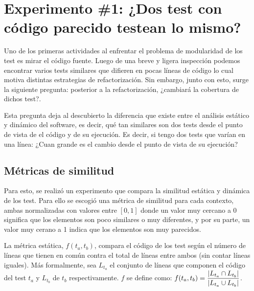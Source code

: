 \chapter{Experimento \#1: ¿Dos test con código parecido testean lo mismo? }

\par Uno de los primeras actividades al enfrentar el problema de modularidad de los test es mirar el código fuente. Luego de una breve y ligera inspección podemos encontrar varios tests similares que difieren en pocas líneas de código lo cual motiva distintas estrategias de refactorización. Sin embargo, junto con esto, surge la siguiente pregunta: posterior a la refactorización, ¿cambiará la cobertura de dichos test?. 

\par Esta pregunta deja al descubierto la diferencia que existe entre el análisis estático y dinámico del software, es decir, qué tan similares son dos tests desde el punto de vista de el código y de su ejecución. Es decir, si tengo dos tests que varían en una línea: ¿Cuan grande es el cambio desde el punto de vista de su ejecución?

\section{Métricas de similitud}
\par Para esto, se realizó un experimento que compara la similitud estática y dinámica de los test. Para ello se escogió una métrica de similitud para cada contexto, ambas normalizadas con valores entre $\left[ 0 , 1 \right]$ donde un valor muy cercano a $0$ significa que los elementos son poco similares o muy diferentes, y por su parte, un valor muy cerano a 1 indica que los elementos son muy parecidos. 

\par La métrica estática, $f(t_a,t_b)$, compara el código de los test según el número de líneas que tienen en común contra el total de líneas entre ambos (sin contar líneas iguales). Más formalmente, sea $L_{t_a}$ el conjunto de líneas que componen el código del test $t_a$ y  $L_{t_b}$ de $t_b$ respectivamente. $f$ se define como: $f(t_a,t_b)= \dfrac{\vert L_{t_a} \cap L_{t_b} \vert}{\vert L_{t_a} \cup L_{t_b} \vert}$.

